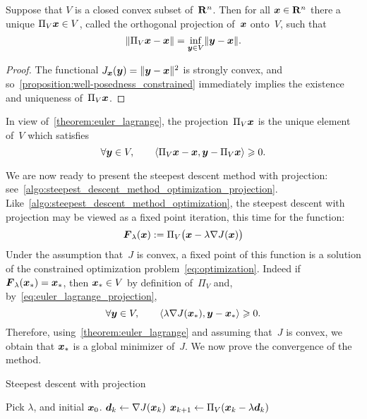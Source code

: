 \begin{proposition}
    Suppose that $V$ is a closed convex subset of~$\mathbf R^n$.
    Then for all $\mathbf{\boldsymbol{x}} \in \mathbf R^n$ there a unique $\Pi_V \mathbf{\boldsymbol{x}} \in V$,
    called the orthogonal projection of~$\mathbf{\boldsymbol{x}}$ onto~$V$,
    such that
    \[
        \lVert\Pi_V \mathbf{\boldsymbol{x}} - \mathbf{\boldsymbol{x}}\rVert = \inf_{\mathbf{\boldsymbol{y}} \in V} \lVert\mathbf{\boldsymbol{y}} - \mathbf{\boldsymbol{x}}\rVert.
    \]
\end{proposition}
\begin{proof}
    The functional $J_{\mathbf{\boldsymbol{x}}}(\mathbf{\boldsymbol{y}}) = \lVert\mathbf{\boldsymbol{y}} - \mathbf{\boldsymbol{x}}\rVert^2$ is strongly convex,
    and so~\cref{proposition:well-posedness_constrained} immediately implies the existence and uniqueness of~$\Pi_V \mathbf{\boldsymbol{x}}$.
\end{proof}

\begin{remark}
    In view of~\cref{theorem:euler_lagrange},
    the projection~$\Pi_V \mathbf{\boldsymbol{x}}$ is the unique element of~$V$ which satisfies
    \begin{equation}
        \label{eq:euler_lagrange_projection}
        \forall \mathbf{\boldsymbol{y}} \in V,
        \qquad \langle\Pi_V \mathbf{\boldsymbol{x}} - \mathbf{\boldsymbol{x}}, \mathbf{\boldsymbol{y}} - \Pi_V\mathbf{\boldsymbol{x}}\rangle \geqslant 0.
    \end{equation}
\end{remark}

We are now ready to present the steepest descent method with projection:
see~\cref{algo:steepest_descent_method_optimization_projection}.
Like~\cref{algo:steepest_descent_method_optimization},
the steepest descent with projection may be viewed as a fixed point iteration,
this time for the function:
\begin{equation}
    \label{eq:constrained_fixed_point}
    \mathbf{\boldsymbol{F}}_{\lambda}(\mathbf{\boldsymbol{x}}) := \Pi_V\bigl(\mathbf{\boldsymbol{x}} - \lambda \nabla J(\mathbf{\boldsymbol{x}})\bigr)
\end{equation}
Under the assumption that~$J$ is convex,
a fixed point of this function is a solution of the constrained optimization problem~\eqref{eq:optimization}.
Indeed if~$\mathbf{\boldsymbol{F}}_{\lambda}(\mathbf{\boldsymbol{x}}_*) = \mathbf{\boldsymbol{x}}_*$,
then $\mathbf{\boldsymbol{x}}_* \in V$ by definition of~$\Pi_V$ and, by~\eqref{eq:euler_lagrange_projection},
\[
    \forall \mathbf{\boldsymbol{y}} \in V,
    \qquad \langle\lambda \nabla J(\mathbf{\boldsymbol{x}}_*), \mathbf{\boldsymbol{y}} - \mathbf{\boldsymbol{x}}_*\rangle \geqslant 0.
\]
Therefore, using~\cref{theorem:euler_lagrange} and assuming that~$J$ is convex,
we obtain that $\mathbf{\boldsymbol{x}}_*$ is a global minimizer of~$J$.
We now prove the convergence of the method.
\begin{algorithm}
\caption{Steepest descent with projection}%
\label{algo:steepest_descent_method_optimization_projection}%
\begin{algorithmic}[1]
    \State Pick $\lambda$, and initial $\mathbf{\boldsymbol{x}}_0$.
        \State $\mathbf{\boldsymbol{d}}_k \gets \nabla J(\mathbf{\boldsymbol{x}}_k)$
        \State $\mathbf{\boldsymbol{x}}_{k+1} \gets \Pi_V(\mathbf{\boldsymbol{x}}_{k} - \lambda \mathbf{\boldsymbol{d}}_k)$
    \EndFor
\end{algorithmic}
\end{algorithm}

